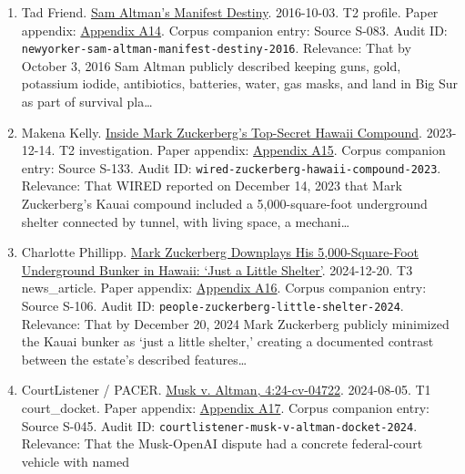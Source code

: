 \documentclass[
  american,
  11pt,
  letterpaper,
]{article}
\begin{document}
\begin{enumerate}
  2026, the AI legitimacy field had expanded into a formal Vatican
  encyclical rather than remaining confined to industry, policy, or
  technical discourse.
\item
  Tad Friend.
  \href{https://www.newyorker.com/magazine/2016/10/10/sam-altmans-manifest-destiny}{Sam
  Altman's Manifest Destiny}. 2016-10-03. T2 profile. Paper appendix:
  \hyperref[ch-08-appendix-a14-sam-altman-s-manifest-destiny]{Appendix
  A14}. Corpus companion entry: Source S-083. Audit ID:
  \texttt{newyorker-sam-altman-manifest-destiny-2016}. Relevance: That
  by October 3, 2016 Sam Altman publicly described keeping guns, gold,
  potassium iodide, antibiotics, batteries, water, gas masks, and land
  in Big Sur as part of survival pla\ldots{}
\item
  Makena Kelly.
  \href{https://www.wired.com/story/mark-zuckerberg-inside-hawaii-compound}{Inside
  Mark Zuckerberg's Top-Secret Hawaii Compound}. 2023-12-14. T2
  investigation. Paper appendix:
  \hyperref[ch-08-appendix-a15-inside-mark-zuckerbergs-top-secret-hawaii-compound]{Appendix
  A15}. Corpus companion entry: Source S-133. Audit ID:
  \texttt{wired-zuckerberg-hawaii-compound-2023}. Relevance: That WIRED
  reported on December 14, 2023 that Mark Zuckerberg's Kauai compound
  included a 5,000-square-foot underground shelter connected by tunnel,
  with living space, a mechani\ldots{}
\item
  Charlotte Phillipp.
  \href{https://people.com/mark-zuckerberg-hawaii-bunker-5000-square-feet-8765376}{Mark
  Zuckerberg Downplays His 5,000-Square-Foot Underground Bunker in
  Hawaii: `Just a Little Shelter'}. 2024-12-20. T3 news\_article. Paper
  appendix:
  \hyperref[ch-08-appendix-a16-mark-zuckerberg-downplays-his-5-000-square-foot-underground-bunker-in-hawaii-just-a-little-shelter]{Appendix
  A16}. Corpus companion entry: Source S-106. Audit ID:
  \texttt{people-zuckerberg-little-shelter-2024}. Relevance: That by
  December 20, 2024 Mark Zuckerberg publicly minimized the Kauai bunker
  as `just a little shelter,' creating a documented contrast between the
  estate's described features\ldots{}
\item
  CourtListener / PACER.
  \href{https://www.courtlistener.com/docket/69013420/musk-v-altman/}{Musk
  v. Altman, 4:24-cv-04722}. 2024-08-05. T1 court\_docket. Paper
  appendix:
  \hyperref[ch-08-appendix-a17-musk-v-altman-4-24-cv-04722]{Appendix
  A17}. Corpus companion entry: Source S-045. Audit ID:
  \texttt{courtlistener-musk-v-altman-docket-2024}. Relevance: That the
  Musk-OpenAI dispute had a concrete federal-court vehicle with named

\end{enumerate}
\end{document}
